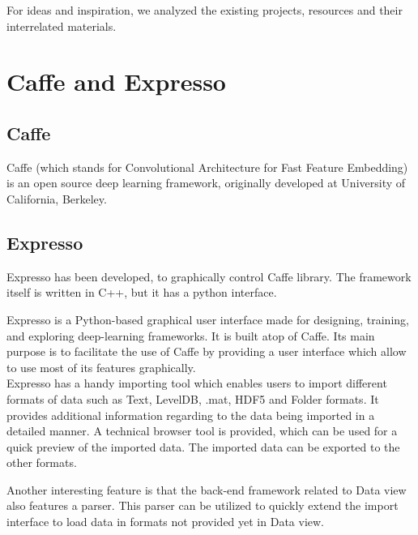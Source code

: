 For ideas and inspiration, we analyzed the existing projects, resources and their interrelated materials.

\section{Caffe and Expresso}

\subsection{Caffe}
Caffe (which stands for Convolutional Architecture for Fast Feature Embedding) is an open source deep learning framework, originally developed at University of California, Berkeley. 

\subsection{Expresso}
Expresso has been developed, to graphically control Caffe library. The framework itself is written in C++, but it has a python interface.

\noindent Expresso is a Python-based graphical user interface made for designing, training, and exploring deep-learning frameworks. It is built atop of Caffe. Its main purpose is to facilitate the use of Caffe by providing a user interface which allow to use most of its features graphically.\\

\noindent Expresso has a handy importing tool which enables users to import different formats of data such as Text, LevelDB, .mat, HDF5 and Folder formats. It provides additional information regarding to the data being imported in a detailed manner.
A technical browser tool is provided, which can be used for a quick preview of the imported data.
The imported data can be exported to the other formats. 

\noindent Another interesting feature is that the back-end framework related to Data view also features a parser. This parser can be utilized to quickly extend the import interface to load data in formats not provided yet in Data view.

